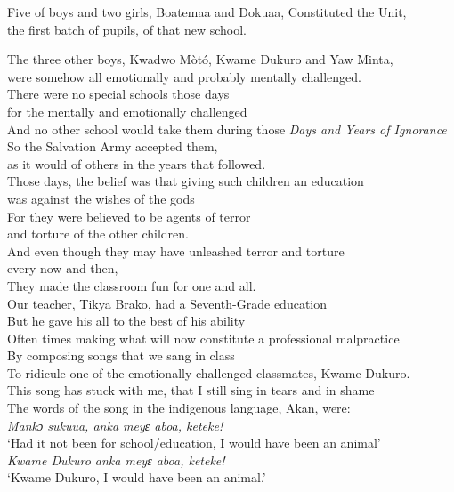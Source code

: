 \begin{refsection}
\noindent Five of boys and two girls, Boatemaa and Dokuaa,
Constituted the Unit,\\
\hspace*{10mm}the first batch of pupils, of that new school.\\
\newpage

\noindent The three other boys, Kwadwo Mòtó, Kwame Dukuro and Yaw Minta,\\
\hspace*{10mm}were somehow all emotionally and probably mentally challenged.\\
\noindent There were no special schools those days\\
\hspace*{10mm}for the mentally and emotionally challenged\\
And no other school would take them during those \textit{Days and Years of Ignorance}\\
So the Salvation Army accepted them,\\
\hspace*{10mm}as it would of others in the years that followed. \\
Those days, the belief was that giving such children an education\\
\hspace*{10mm}was against the wishes of the gods\\
For they were believed to be agents of terror\\
\hspace*{10mm}and torture of the other children. \\
\noindent And even though they may have unleashed terror and torture\\
\hspace*{10mm}every now and then,\\
They made the classroom fun for one and all.\\

\noindent Our teacher, Tikya Brako, had a Seventh-Grade education\\
But he gave his all to the best of his ability\\
Often times making what will now constitute a professional malpractice\\
By composing songs that we sang in class\\
To ridicule one of the emotionally challenged classmates, Kwame Dukuro. \\
This song has stuck with me, that I still sing in tears and in shame\\
The words of the song in the indigenous language, Akan, were: \\
\hspace*{10mm}\textit{Mankɔ sukuua, anka meyɛ aboa, keteke!}\\
\hspace*{10mm}‘Had it not been for school/education, I would have been an animal’\\
\hspace*{10mm}\textit{Kwame Dukuro anka meyɛ aboa, keteke!}\\
\hspace*{10mm}‘Kwame Dukuro, I would have been an animal.’\\


\end{refsection}
